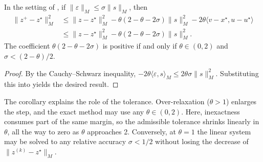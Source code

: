\documentclass[11pt]{article}
\begin{document}
\begin{corollary}\label{cor:over-under-relaxation}
    In the setting of , if $\|\varepsilon\|_M \leq \sigma\|s\|_M$, then
    \begin{align}\label{eq:lyapunov-decrease-estimate}
        \|z^{+} - z^\star\|_M^2 &\leq \|z - z^\star\|_M^2 - \theta(2-\theta-2\sigma)\|s\|^2_M - 2\theta\langle v - x^\star, u - u^\star\rangle \\
        &\leq \|z - z^\star\|_M^2 - \theta(2-\theta-2\sigma)\|s\|^2_M.
    \end{align}
    The coefficient $\theta(2 - \theta - 2\sigma)$ is positive if and only if $\theta \in (0, 2)$ and $\sigma < (2 - \theta)/2$.
\end{corollary}
\begin{proof}
    By the Cauchy--Schwarz inequality, $-2\theta\langle\varepsilon, s\rangle_M \leq 2\theta\sigma\|s\|_M^2$.
    Substituting this into  yields the desired result.
\end{proof}
The corollary explains the role of the tolerance.
Over-relaxation ($\theta > 1$) enlarges the step, and the exact method may use any $\theta \in (0, 2)$.
Here, inexactness consumes part of the same margin, so the admissible tolerance shrinks linearly in $\theta$, all the way to zero as $\theta$ approaches 2.
Conversely, at $\theta = 1$ the linear system may be solved to any relative accuracy $\sigma < 1/2$ without losing the decrease of $\|z^{(k)} - z^\star\|_M$.
\end{document}
